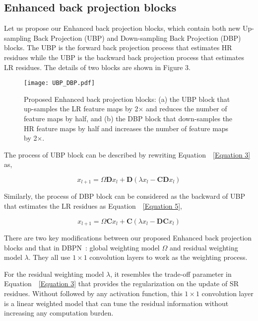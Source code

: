 \documentclass[10pt,twocolumn,letterpaper]{article}
\begin{document}
\subsection{Enhanced back projection blocks}
Let us propose our Enhanced back projection blocks, which contain both new Up-sampling Back Projection (UBP) and Down-sampling Back Projection (DBP) blocks. The UBP is the forward back projection process that estimates HR residues while the UBP is the backward back projection process that estimates LR residues. The details of two blocks are shown in Figure 3. 

\begin{figure}[htb]
\vskip 0.01in
\begin{center}
\centerline{\texttt{[image: UBP\_DBP.pdf]}}
\caption{Proposed Enhanced back projection blocks: (a) the UBP block that up-samples the LR feature maps by 2$\times$ and reduces the number of feature maps by half, and (b) the DBP block that down-samples the HR feature maps by half and increases the number of feature maps by 2$\times$.}
\label{Figure 3}
\end{center}
\vskip -0.3in
\end{figure}

The process of UBP block can be described by rewriting Equation~~\ref{Equation 3} as,
\begin{small}
\begin{equation}
\mathit{x}_{\mathit{l}+1}=\Omega{\mathbf{D}\mathit{x_l}}+\mathbf{D}\left(\lambda\mathit{x_l}-\mathbf{CD}\mathit{x_l}\right) \tag{4}
\label{Equation 4}
\end{equation}
\end{small}
Similarly, the process of DBP block can be considered as the backward of UBP that estimates the LR residues as Equation~~\ref{Equation 5},
\begin{small}
\begin{equation}
\mathit{x}_{\mathit{l}+1}=\Omega{\mathbf{C}\mathit{x_l}}+\mathbf{C}\left(\lambda\mathit{x_l}-\mathbf{DC}\mathit{x_l}\right) \tag{5}
\label{Equation 5}
\end{equation}
\end{small}
There are two key modifications between our proposed Enhanced back projection blocks and that in DBPN~\cite{DBPN}: global weighting model $\Omega$ and residual weighting model $\lambda$. They all use $1\times1$ convolution layers to work as the weighting process. 

For the residual weighting model $\lambda$, it resembles the trade-off parameter in Equation~~\ref{Equation 3} that provides the regularization on the update of SR residues. Without followed by any activation function, this $1\times1$ convolution layer is a linear weighted model that can tune the residual information without increasing any computation burden.
\end{document}

